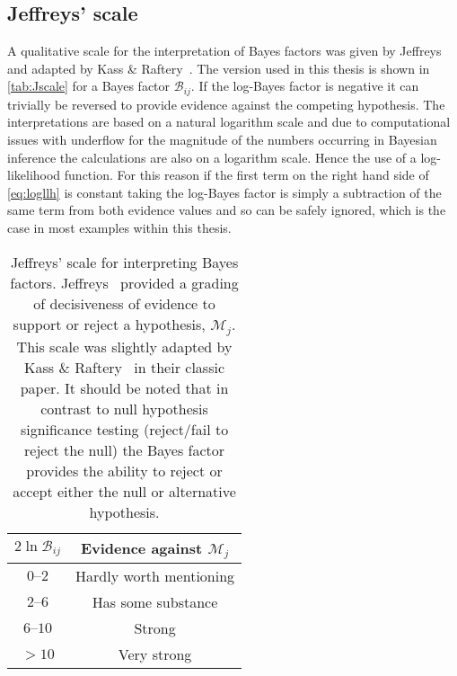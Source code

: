 \subsection{Jeffreys' scale}\label{sec:Jscale}
A qualitative scale for the interpretation of Bayes factors was given by Jeffreys~\cite{jeffreys1961} and adapted by Kass \& Raftery~\cite{kass1995}.
The version used in this thesis is shown in \autoref{tab:Jscale} for a Bayes factor $\mathcal B_{ij}$.
If the log-Bayes factor is negative it can trivially be reversed to provide evidence against the competing hypothesis.
The interpretations are based on a natural logarithm scale and due to computational issues with underflow for the magnitude of the numbers occurring in Bayesian inference the calculations are also on a logarithm scale.
Hence the use of a log-likelihood function.
For this reason if the first term on the right hand side of \autoref{eq:logllh} is constant taking the log-Bayes factor is simply a subtraction of the same term from both evidence values and so can be safely ignored, which is the case in most examples within this thesis.
\begin{table}[t!h]
  \centering
  \begin{tabular}{cc}
    \toprule
    $2\ln\mathcal B_{ij}$ & Evidence against $\mathcal M_j$\\
    \midrule
    $0\text{--}2$ & Hardly worth mentioning\\
    $2\text{--}6$ & Has some substance\\
    $6\text{--}10$ & Strong\\
    $> 10$ & Very strong\\
    \bottomrule
  \end{tabular}
  \caption{Jeffreys' scale for interpreting Bayes factors.
    Jeffreys~\cite{jeffreys1961} provided a grading of decisiveness of evidence to support or reject a hypothesis, $\mathcal M_j$.
    This scale was slightly adapted by Kass \& Raftery~\cite{kass1995} in their classic paper.
    It should be noted that in contrast to null hypothesis significance testing (reject/fail to reject the null) the Bayes factor provides the ability to reject or accept either the null or alternative hypothesis.
  }
  \label{tab:Jscale}
\end{table}
